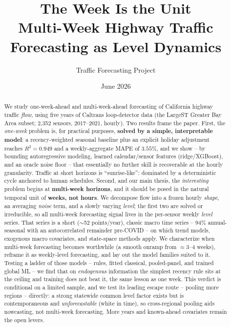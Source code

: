\documentclass[11pt]{article}
\title{\textbf{The Week Is the Unit}\\[3pt]
\large Multi-Week Highway Traffic Forecasting as Level Dynamics}
\author{Traffic Forecasting Project}
\date{June 2026}
\begin{document}
\maketitle

\begin{abstract}
\sloppy
\noindent
We study one-week-ahead and multi-week-ahead forecasting of California highway
traffic \emph{flow}, using five years of Caltrans loop-detector data (the LargeST
Greater Bay Area subset; 2{,}352 sensors, 2017--2021, hourly). Two results frame
the paper. First, the \emph{one-week} problem is, for practical purposes,
\textbf{solved by a simple, interpretable model}: a recency-weighted seasonal
baseline plus an explicit holiday adjustment reaches $R^2=0.949$ and a
weekly-aggregate MAPE of $3.55\%$, and we show -- by bounding autoregressive
modeling, learned calendar/sensor features (ridge/XGBoost), and an oracle noise
floor -- that essentially no further skill is recoverable at the hourly
granularity. Traffic at short horizons is ``sunrise-like'': dominated by a
deterministic cycle anchored to human schedules. Second, and our main thesis, the
\emph{interesting} problem begins at \textbf{multi-week horizons}, and it should
be posed in the natural temporal unit of \textbf{weeks, not hours}. We decompose
flow into a frozen hourly \emph{shape}, an averaging \emph{noise} term, and a
slowly varying \emph{level}; the first two are solved or irreducible, so all
multi-week forecasting signal lives in the per-sensor weekly \emph{level} series.
That series is a short ($\sim$52 points/year), classic macro time series --
$94\%$ annual-seasonal with an autocorrelated remainder pre-COVID -- on which
trend models, exogenous macro covariates, and state-space methods apply. We
characterize when multi-week forecasting becomes worthwhile (a smooth onramp from
$\approx$3--4 weeks), reframe it as weekly-level forecasting, and lay out the
model families suited to it. Testing a ladder of those models -- rules, fitted
classical, pooled-panel, and trained global ML -- we find that on \emph{endogenous}
information the simplest recency rule sits at the ceiling and training does not beat
it, the same lesson as one week. This verdict is conditional on a limited sample,
and we test its leading escape route -- pooling more regions -- directly: a strong
statewide common level factor exists but is contemporaneous and \emph{unforecastable}
(white in time), so cross-regional pooling aids nowcasting, not multi-week
forecasting. More years and known-ahead covariates remain the open levers.
\end{abstract}
\end{document}
